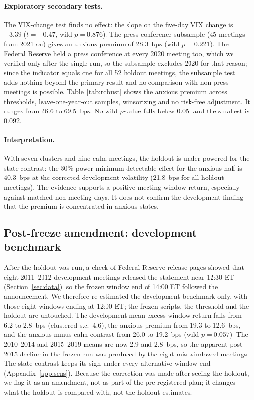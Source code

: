 \paragraph{Exploratory secondary tests.} The VIX-change test finds no effect: the slope on the five-day VIX change is $-3.39$ ($t=-0.47$, wild $p=0.876$). The press-conference subsample (45 meetings from 2021 on) gives an anxious premium of 28.3~bps (wild $p=0.221$). The Federal Reserve held a press conference at every 2020 meeting too, which we verified only after the single run, so the subsample excludes 2020 for that reason; since the indicator equals one for all 52 holdout meetings, the subsample test adds nothing beyond the primary result and no comparison with non-press meetings is possible. Table~\ref{tab:robust} shows the anxious premium across thresholds, leave-one-year-out samples, winsorizing and no risk-free adjustment. It ranges from 26.6 to 69.5~bps. No wild $p$-value falls below 0.05, and the smallest is 0.092.

\begin{table}[ht]\centering\caption{Robustness of the holdout anxious premium (exploratory).}\label{tab:robust}
\small\end{table}

\paragraph{Interpretation.} With seven clusters and nine calm meetings, the holdout is under-powered for the state contrast: the 80\% power minimum detectable effect for the anxious half is 40.3~bps at the corrected development volatility (21.8~bps for all holdout meetings). The evidence supports a positive meeting-window return, especially against matched non-meeting days. It does not confirm the development finding that the premium is concentrated in anxious states.


\subsection{Post-freeze amendment: development benchmark}\label{sec:amend}
After the holdout was run, a check of Federal Reserve release pages showed that eight 2011--2012 development meetings released the statement near 12:30 ET (Section~\ref{sec:data}), so the frozen window end of 14:00 ET followed the announcement. We therefore re-estimated the development benchmark only, with those eight windows ending at 12:00 ET; the frozen scripts, the threshold and the holdout are untouched. The development mean excess window return falls from 6.2 to 2.8~bps (clustered s.e.\ 4.6), the anxious premium from 19.3 to 12.6~bps, and the anxious-minus-calm contrast from 26.0 to 19.2~bps (wild $p=0.057$). The 2010--2014 and 2015--2019 means are now 2.9 and 2.8~bps, so the apparent post-2015 decline in the frozen run was produced by the eight mis-windowed meetings. The state contrast keeps its sign under every alternative window end (Appendix~\ref{app:sens}). Because the correction was made after seeing the holdout, we flag it as an amendment, not as part of the pre-registered plan; it changes what the holdout is compared with, not the holdout estimates.


